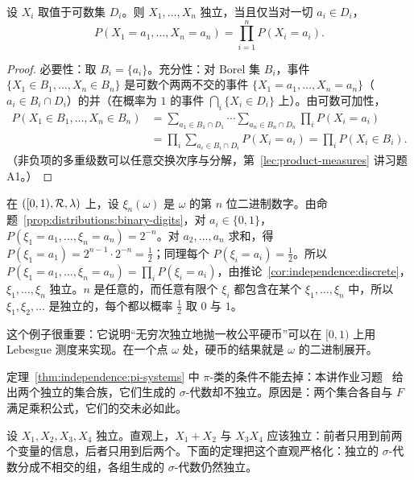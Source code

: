\begin{corollary}[离散型随机变量的独立性]\label{cor:independence:discrete}
设 $X_i$ 取值于可数集 $D_i$。则 $X_1,\dots,X_n$ 独立，当且仅当对一切 $a_i\in D_i$，
\[
P(X_1=a_1,\dots,X_n=a_n)=\prod_{i=1}^nP(X_i=a_i).
\]
\end{corollary}
\begin{proof}
必要性：取 $B_i=\{a_i\}$。充分性：对 Borel 集 $B_i$，事件 $\{X_1\in B_1,\dots,X_n\in B_n\}$ 是可数个两两不交的事件 $\{X_1=a_1,\dots,X_n=a_n\}$（$a_i\in B_i\cap D_i$）的并（在概率为 $1$ 的事件 $\bigcap_i\{X_i\in D_i\}$ 上）。由可数可加性，
\[
\begin{aligned}
P(X_1\in B_1,\dots,X_n\in B_n)&=\sum_{a_1\in B_1\cap D_1}\cdots\sum_{a_n\in B_n\cap D_n}\prod_iP(X_i=a_i)\\
&=\prod_i\sum_{a_i\in B_i\cap D_i}P(X_i=a_i)=\prod_iP(X_i\in B_i).
\end{aligned}
\]
（非负项的多重级数可以任意交换次序与分解，第~\ref{lec:product-measures} 讲习题 A1。）
\end{proof}

\begin{example}[二进制数字是独立的公平硬币]\label{ex:independence:binary-digits}
在 $([0,1),\mathcal{R},\lambda)$ 上，设 $\xi_n(\omega)$ 是 $\omega$ 的第 $n$ 位二进制数字。由命题~\ref{prop:distributions:binary-digits}，对 $a_i\in\{0,1\}$，$P(\xi_1=a_1,\dots,\xi_n=a_n)=2^{-n}$。对 $a_2,\dots,a_n$ 求和，得 $P(\xi_1=a_1)=2^{n-1}\cdot2^{-n}=\frac12$；同理每个 $P(\xi_i=a_i)=\frac12$。所以 $P(\xi_1=a_1,\dots,\xi_n=a_n)=\prod_iP(\xi_i=a_i)$，由推论~\ref{cor:independence:discrete}，$\xi_1,\dots,\xi_n$ 独立。$n$ 是任意的，而任意有限个 $\xi_i$ 都包含在某个 $\xi_1,\dots,\xi_n$ 中，所以 $\xi_1,\xi_2,\dots$ 是独立的，每个都以概率 $\frac12$ 取 $0$ 与 $1$。

这个例子很重要：它说明“无穷次独立地抛一枚公平硬币”可以在 $[0,1)$ 上用 Lebesgue 测度来实现。在一个点 $\omega$ 处，硬币的结果就是 $\omega$ 的二进制展开。
\end{example}

\begin{remark}[为什么要求 $\pi$-类]
定理~\ref{thm:independence:pi-systems} 中 $\pi$-类的条件不能去掉：本讲作业习题~ 给出两个独立的集合族，它们生成的 $\sigma$-代数却不独立。原因是：两个集合各自与 $F$ 满足乘积公式，它们的交未必如此。
\end{remark}


设 $X_1,X_2,X_3,X_4$ 独立。直观上，$X_1+X_2$ 与 $X_3X_4$ 应该独立：前者只用到前两个变量的信息，后者只用到后两个。下面的定理把这个直观严格化：独立的 $\sigma$-代数分成不相交的组，各组生成的 $\sigma$-代数仍然独立。

